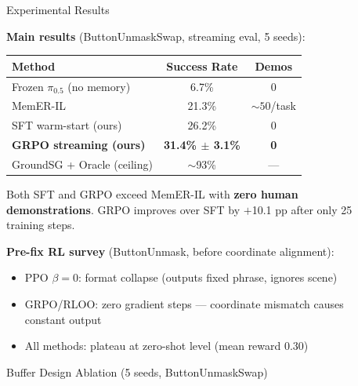 \documentclass[final]{beamer}
\newlength{\sepwidth}
\newlength{\colwidth}
\newcommand{\separatorcolumn}{\begin{column}{\sepwidth}\end{column}}
\begin{document}
\begin{frame}[t]
\begin{columns}[t]
\separatorcolumn

\begin{column}{\colwidth}

  \begin{block}{Experimental Results}

    \textbf{Main results} (ButtonUnmaskSwap, streaming eval, 5 seeds):

    \begin{center}
    \small
    \begin{tabular}{lcc}
      \toprule
      \textbf{Method} & \textbf{Success Rate} & \textbf{Demos} \\
      \midrule
      Frozen $\pi_{0.5}$ (no memory)  & 6.7\%  & 0 \\
      MemER-IL~\cite{memer}           & 21.3\% & ${\sim}50$/task \\
      SFT warm-start (ours)           & 26.2\% & 0 \\
      \textbf{GRPO streaming (ours)}  & \textbf{31.4\% $\pm$ 3.1\%} & \textbf{0} \\
      GroundSG + Oracle (ceiling)     & ${\sim}$93\% & --- \\
      \bottomrule
    \end{tabular}
    \end{center}
    \vspace{0.3em}
    \footnotesize{Both SFT and GRPO exceed MemER-IL with \textbf{zero human demonstrations}.
    GRPO improves over SFT by $+$10.1 pp after only 25 training steps.}

    \vspace{0.6em}
    \textbf{Pre-fix RL survey} (ButtonUnmask, before coordinate alignment):
    \begin{itemize}
      \item PPO $\beta{=}0$: format collapse (outputs fixed phrase, ignores scene)
      \item GRPO/RLOO: zero gradient steps — coordinate mismatch causes constant output
      \item All methods: plateau at zero-shot level (mean reward 0.30)
    \end{itemize}

  \end{block}

  \begin{block}{Buffer Design Ablation (5 seeds, ButtonUnmaskSwap)}


\end{block}
\end{column}
\end{columns}
\end{frame}
\end{document}
